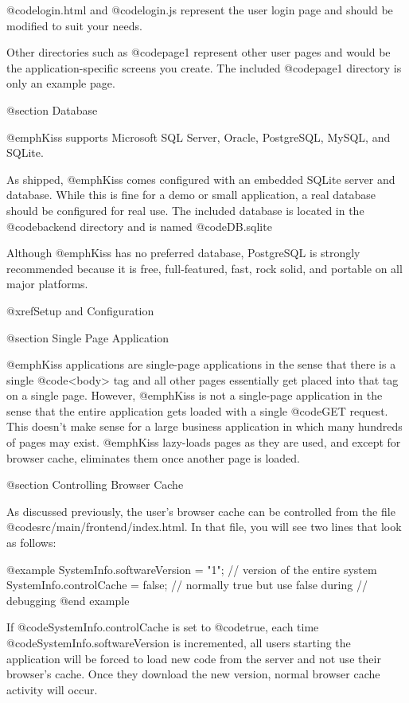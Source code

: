 @code{login.html} and @code{login.js} represent the user login page
and should be modified to suit your needs.

Other directories such as @code{page1} represent other user pages and
would be the application-specific screens you create.  The included
@code{page1} directory is only an example page.

@section Database

@emph{Kiss} supports Microsoft SQL Server, Oracle, PostgreSQL, MySQL, and
SQLite.

As shipped, @emph{Kiss} comes configured with an embedded SQLite
server and database.  While this is fine for a demo or small
application, a real database should be configured for real use.
The included database is located in the @code{backend} directory
and is named @code{DB.sqlite}

Although @emph{Kiss} has no preferred database, PostgreSQL is strongly
recommended because it is free, full-featured, fast, rock solid, and
portable on all major platforms.

@xref{Setup and Configuration}


@section Single Page Application

@emph{Kiss} applications are single-page applications in the sense
that there is a single @code{<body>} tag and all other pages
essentially get placed into that tag on a single page.  However,
@emph{Kiss} is not a single-page application in the sense that the
entire application gets loaded with a single @code{GET} request.  This
doesn't make sense for a large business application in which many
hundreds of pages may exist.  @emph{Kiss} lazy-loads pages as they are
used, and except for browser cache, eliminates them once another page
is loaded.

@section Controlling Browser Cache

As discussed previously, the user's browser cache can be controlled from the file
@code{src/main/frontend/index.html}. In that file, you will see two lines
that look as follows:

@example
SystemInfo.softwareVersion = "1";  // version of the entire system
SystemInfo.controlCache = false;   // normally true but use false during
                            // debugging
@end example

If @code{SystemInfo.controlCache} is set to @code{true}, each time @code{SystemInfo.softwareVersion}
is incremented, all users starting the application will be forced to
load new code from the server and not use their browser's cache.  Once
they download the new version, normal browser cache activity will
occur.

